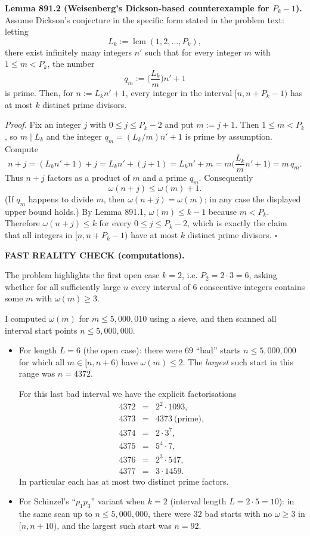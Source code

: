 \medskip
\noindent \textbf{Lemma 891.2 (Weisenberg's Dickson-based counterexample for $P_k-1$).}
Assume Dickson's conjecture in the specific form stated in the problem text: letting
\[
L_k := \operatorname{lcm}(1,2,\dots,P_k),
\]
there exist infinitely many integers $n'$ such that for every integer $m$ with $1\le m<P_k$, the number
\[
q_m := \Big(\frac{L_k}{m}\Big) n' + 1
\]
is prime. Then, for $n:=L_k n' + 1$, every integer in the interval $[n,n+P_k-1)$ has at most $k$ distinct prime divisors.

\noindent \emph{Proof.}
Fix an integer $j$ with $0\le j\le P_k-2$ and put $m:=j+1$. Then $1\le m < P_k$, so $m\mid L_k$ and the integer $q_m=(L_k/m)n'+1$ is prime by assumption. Compute
\[
 n+j = (L_k n' + 1) + j = L_k n' + (j+1) = L_k n' + m = m\Big(\frac{L_k}{m}n' + 1\Big) = m\,q_m.
\]
Thus $n+j$ factors as a product of $m$ and a prime $q_m$. Consequently
\[
 \omega(n+j) \le \omega(m) + 1.
\]
(If $q_m$ happens to divide $m$, then $\omega(n+j)=\omega(m)$; in any case the displayed upper bound holds.)
By Lemma 891.1, $\omega(m)\le k-1$ because $m<P_k$. Therefore $\omega(n+j)\le k$ for every $0\le j\le P_k-2$, which is exactly the claim that all integers in $[n,n+P_k-1)$ have at most $k$ distinct prime divisors.
\hfill$\square$

\medskip
\noindent \textbf{FAST REALITY CHECK (computations).}

\noindent The problem highlights the first open case $k=2$, i.e. $P_2=2\cdot 3=6$, asking whether for all sufficiently large $n$ every interval of $6$ consecutive integers contains some $m$ with $\omega(m)\ge 3$.

\noindent I computed $\omega(m)$ for $m\le 5{,}000{,}010$ using a sieve, and then scanned all interval start points $n\le 5{,}000{,}000$.

\begin{itemize}
\item For length $L=6$ (the open case): there were $69$ ``bad'' starts $n\le 5{,}000{,}000$ for which all $m\in[n,n+6)$ have $\omega(m)\le 2$. The \emph{largest} such start in this range was $n=4372$.

For this last bad interval we have the explicit factorisations
\[
\begin{array}{rcl}
4372&=&2^2\cdot 1093,\\
4373&=&4373\ \text{(prime)},\\
4374&=&2\cdot 3^7,\\
4375&=&5^4\cdot 7,\\
4376&=&2^3\cdot 547,\\
4377&=&3\cdot 1459.
\end{array}
\]
In particular each has at most two distinct prime factors.

\item For Schinzel's ``$p_1p_3$'' variant when $k=2$ (interval length $L=2\cdot 5=10$): in the same scan up to $n\le 5{,}000{,}000$, there were $32$ bad starts with no $\omega\ge 3$ in $[n,n+10)$, and the largest such start was $n=92$.
\end{itemize}

